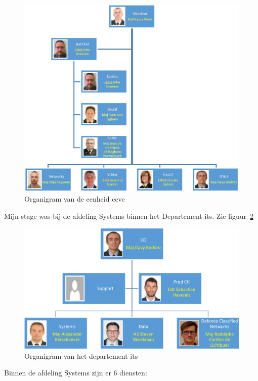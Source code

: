 \begin{figure}
    \includegraphics[width=\textwidth]{img/organigram-ccvc.png}
    \caption{\label{fig:organigram-ccvc}Organigram van de \gls{eenheid} \gls{ccvc}~\autocite{Defensie2022a}}
\end{figure}

Mijn stage was bij de afdeling Systems binnen het Departement \gls{its}. Zie figuur~\ref{fig:organigram-its}

\begin{figure}
    \includegraphics[width=\textwidth]{img/organigram-its.png}
    \caption{\label{fig:organigram-its}Organigram van het departement \gls{its}~\autocite{Defensie2022a}}
\end{figure}

Binnen de afdeling Systems zijn er 6 diensten:

